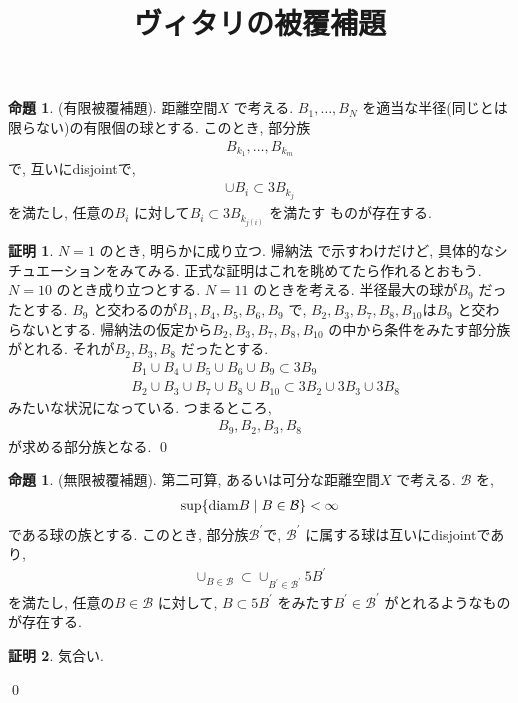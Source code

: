 \documentclass[10pt, fleqn, label-section=none]{bxjsarticle}
\title{ヴィタリの被覆補題}
\date{}
\author{}
\theoremstyle{definition}
\newtheorem{prop}[dfn]{命題}
\newtheorem*{pf*}{証明}
\newcommand{\cbra}[1]{\mleft\{#1\mright\}}
\newcommand{\diam}{\textrm{diam}}
\renewcommand{\;}{\, ; \,}
\begin{document}
\maketitle

\section{}



\begin{prop}(有限被覆補題). 距離空間$X $ で考える. $B_1, \ldots , B_N$ を適当な半径(同じとは限らない)の有限個の球とする. このとき, 部分族
\begin{align*} B_{k_1}, \ldots , B_{k_m}\end{align*}
で, 互いにdisjointで, 
\begin{align*} \cup B_i \subset 3 B_{k_j}\end{align*}
を満たし, 
任意の$B_i$ に対して$B_i \subset 3B_{k_{j(i)} }$ を満たす
ものが存在する. 
\end{prop}
\begin{pf*}
$N = 1$ のとき, 明らかに成り立つ. 帰納法 で示すわけだけど, 具体的なシチュエーションをみてみる. 正式な証明はこれを眺めてたら作れるとおもう. $N = 10$ のとき成り立つとする. $N = 11$ のときを考える. 半径最大の球が$B_9$ だったとする. $B_9$ と交わるのが$B_1,B_4, B_5, B_6, B_9$ で, $B_2, B_3, B_7, B_8,  B_{10}$は$B_9$ と交わらないとする. 帰納法の仮定から$B_2, B_3, B_7, B_8, B_{10}$ の中から条件をみたす部分族がとれる. それが$B_2, B_3, B_8$ だったとする. 
\begin{align*} &B_1 \cup B_4 \cup B_5 \cup B_6 \cup B_9 \subset 3B_9 \\ &B_2 \cup B_3 \cup B_7 \cup B_8 \cup B_{10} \subset 3 B_2 \cup 3B_3 \cup 3B_8  \end{align*}
みたいな状況になっている. つまるところ, 
\begin{align*} B_9, B_2, B_3, B_8\end{align*}
が求める部分族となる.  
\qed
\end{pf*}


\begin{prop}(無限被覆補題). 第二可算, あるいは可分な距離空間$X$ で考える. $\mathcal B$ を, 
\begin{align*} \sup \cbra{ \diam B \mid B \in \mathcal B} < \infty \end{align*}
である球の族とする. このとき, 部分族$\mathcal B ^\prime $で, $\mathcal B ^\prime $ に属する球は互いにdisjointであり, 
\begin{align*} \cup_{B \in \mathcal B} \subset \cup_{B^\prime \in \mathcal B^\prime } 5 B ^\prime \end{align*}
を満たし, 任意の$B \in \mathcal B$ に対して, $B \subset 5 B^\prime $ をみたす$B^\prime \in \mathcal B ^\prime$ がとれるようなものが存在する. 
\end{prop}
\begin{pf*}

気合い. 

\qed
\end{pf*}
\end{document}
